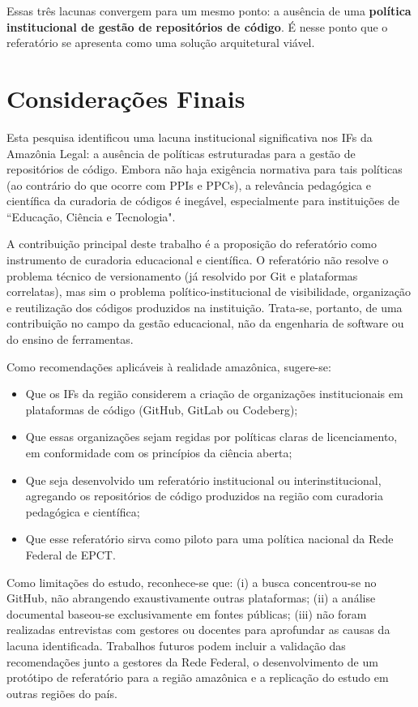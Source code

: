 \documentclass[english, spanish, brazilian]{RBIEarticle}
\begin{document}
	Essas três lacunas convergem para um mesmo ponto: a ausência de uma \textbf{política institucional de gestão de repositórios de código}. É nesse ponto que o referatório se apresenta como uma solução arquitetural viável.
	
	\section{Considerações Finais}
	
	Esta pesquisa identificou uma lacuna institucional significativa nos IFs da Amazônia Legal: a ausência de políticas estruturadas para a gestão de repositórios de código. Embora não haja exigência normativa para tais políticas (ao contrário do que ocorre com PPIs e PPCs), a relevância pedagógica e científica da curadoria de códigos é inegável, especialmente para instituições de ``Educação, Ciência e Tecnologia".
	
	A contribuição principal deste trabalho é a proposição do referatório como instrumento de curadoria educacional e científica. O referatório não resolve o problema técnico de versionamento (já resolvido por Git e plataformas correlatas), mas sim o problema político-institucional de visibilidade, organização e reutilização dos códigos produzidos na instituição. Trata-se, portanto, de uma contribuição no campo da gestão educacional, não da engenharia de software ou do ensino de ferramentas.
	
	Como recomendações aplicáveis à realidade amazônica, sugere-se:
	\begin{itemize}
		\item Que os IFs da região considerem a criação de organizações institucionais em plataformas de código (GitHub, GitLab ou Codeberg);
		\item Que essas organizações sejam regidas por políticas claras de licenciamento, em conformidade com os princípios da ciência aberta;
		\item Que seja desenvolvido um referatório institucional ou interinstitucional, agregando os repositórios de código produzidos na região com curadoria pedagógica e científica;
		\item Que esse referatório sirva como piloto para uma política nacional da Rede Federal de EPCT.
	\end{itemize}
	
	Como limitações do estudo, reconhece-se que: (i) a busca concentrou-se no GitHub, não abrangendo exaustivamente outras plataformas; (ii) a análise documental baseou-se exclusivamente em fontes públicas; (iii) não foram realizadas entrevistas com gestores ou docentes para aprofundar as causas da lacuna identificada. Trabalhos futuros podem incluir a validação das recomendações junto a gestores da Rede Federal, o desenvolvimento de um protótipo de referatório para a região amazônica e a replicação do estudo em outras regiões do país.
	
\end{document}

